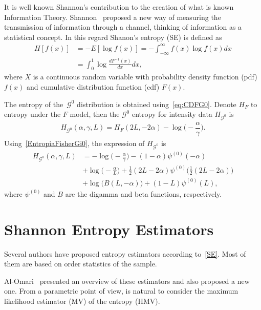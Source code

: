 \documentclass[journal]{IEEEtran}
\begin{document}
It is well known Shannon's contribution to the creation of what is known Information Theory. 
Shannon~\cite{Shannon1948} proposed a new way of
measuring the transmission of information through a channel, thinking of information as a statistical concept. 
In this regard Shanon's entropy (SE) is defined as
\begin{align}
	\label{SE}
	H[f(x)]&=-E[\log f(x)]=-\int_{-\infty}^{\infty} f(x) \log f(x) d x\\
	       &= \int_{0}^{1} \log \frac{d F^{-1}(x)}{d x} d x,
\end{align}
where $X$ is a continuous random variable with probability density function (pdf) $f(x)$ and
cumulative distribution function (cdf) $F(x)$. 

The entropy of the~$\mathcal{G}^0$ distribution is obtained using~\eqref{eq:CDFG0}.
Denote $H_{F}$ to entropy under the $F$ model, then the $\mathcal{G}^0$ entropy for intensity data $H_{\mathcal G^0}$ is 
\begin{align}
	\label{EntropiaFisherGi0}
	H_{\mathcal G^0}(\alpha,\gamma,L)=H_{F}(2 L, - 2 \alpha) -\log\Big(-\dfrac{\alpha}{\gamma}\Big).
\end{align}
Using~\eqref{EntropiaFisherGi0}, the
expression of $H_{\mathcal G^0}$ is
\begin{align}
	\label{EG0}
	H_{\mathcal G^0}(\alpha,\gamma,L)&=-\log \Big(-\frac{\alpha }{\gamma }\Big)-(1-\alpha ) \psi^{(0)}(-\alpha )\\ \nonumber
	&+\log \Big(-\frac{\alpha }{L}\Big)+\frac{1}{2} (2 L-2 \alpha ) \psi ^{(0)}\Big(\frac{1}{2} (2 L-2 \alpha )\Big)\\ \nonumber
	&+\log \big(B(L,-\alpha )\big)+(1-L) \psi^{(0)}(L),
\end{align}
where $\psi^{(0)}$ and $B$ are the digamma and beta functions, respectively.

\section{Shannon Entropy Estimators}

Several authors have proposed entropy estimators according to~\eqref{SE}.
Most of them are based on order statistics of the sample. 

Al-Omari~\cite{AlOmari2016} presented an overview of these estimators and also proposed a new one. 
From a parametric point of view, is natural to consider the maximum likelihood estimator (MV) of the entropy (HMV).
\end{document}
